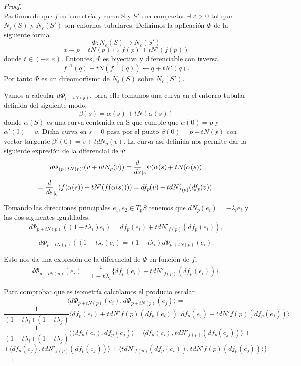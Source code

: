 \begin{proof}
	${ }$\\
	
	Partimos de que $f$ es isometría y como S y $S'$ son compactas $\exists$ $\varepsilon > 0$ tal que $N_\varepsilon(S)$ y $N_\varepsilon(S')$ son entornos tubulares. Definimos la aplicación $\Phi$ de la siguiente forma:
	\[
	\Phi : N_\varepsilon(S) \longrightarrow N_\varepsilon(S')
	\]
	\[
	x = p + tN(p) \longmapsto f(p) + tN'(f(p))
	\]
	donde $t \in (-\varepsilon, \varepsilon)$. Entonces, $\Phi$ es biyectiva y diferenciable con inversa
	\[
	f^{-1}(q) + tN(f^{-1}(q)) \longleftarrow q + tN'(q).
	\]
	Por tanto $\Phi$ es un difeomorfismo de $N_\varepsilon(S)$ sobre $N_\varepsilon(S')$.
	
	${ }$\\	
	
	Vamos a calcular $d\Phi_{p+tN(p)}$, para ello tomamos una curva en el entorno tubular definida del siguiente modo,
	\[
	\beta(s) = \alpha(s) + tN(\alpha(s))
	\]
	donde $\alpha(S)$ es una curva contenida en S que cumple que $\alpha(0) = p$ y $\alpha'(0) = v$. Dicha curva en $s = 0$ pasa por el punto $\beta(0) = p + tN(p)$  con vector tangente $\beta'(0) = v + tdN_p(v)$. La curva así definida nos permite dar la siguiente expresión de la diferencial de $\Phi$:
	\[
	d\Phi_{(p + tN(p))}(v + tdN_p(v)) = \frac{d}{ds}_{\arrowvert_0} \Phi(\alpha(s) + tN(\alpha(s))
	\]
	\[
	= \frac{d}{ds}_{\arrowvert_0} (f(\alpha(s)) + tN'(f(\alpha(s)))) = df_p(v) + tdN'_{f(p)}(df_p(v)).
	\]
	
	
	${ }$\\	
	
	Tomando las direcciones principales ${e_1, e_2} \in T_p S$ tenemos que $dN_p(e_i) = -\lambda_ie_i$ y las dos siguientes igualdades:
	\[
	d\Phi_{p + tN(p)}((1 - t\lambda_i)e_i) = df_p(e_i) + tdN'_{f(p)}(df_p(e_i)),
	\]
	
	\[
	d\Phi_{p + tN(p)}((1 - t\lambda_i)e_i) = (1 - t\lambda_i)d\Phi_{p + tN(p)}(e_i).
	\]
	
	Esto nos da una expresión de la diferencial de $\Phi$ en función de $f$,
	\[
	d\Phi_{p + tN(p)}(e_i) = \frac{1}{1 - t\lambda_i} \{df_p(e_i) + tdN'_{f(p)}(df_p(e_i))\}.
	\]
	
	Para comprobar que es isometría calculamos el producto escalar
	\[
	\langle d\Phi_{p + tN(p)}(e_i), d\Phi_{p + tN(p)}(e_j) \rangle = 
	\]
	\[
	\frac{1}{(1 - t\lambda_i)(1 - t\lambda_j)} \langle df_p(e_i) + tdN'{f(p)}(df_p(e_i)), df_p(e_j) + tdN'{f(p)}(df_p(e_j)) \rangle =
	\]
	\[
	\frac{1}{(1 - t\lambda_i)(1 - t\lambda_j)}( \langle df_p(e_i), df_p(e_j) \rangle +  \langle df_p(e_i), tdN'_{f(p)}(df_p(e_j)) \rangle + 
	\]
	\[
	+ \langle df_p(e_j), tdN'_{f(p)}(df_p(e_j)) \rangle + \langle tdN'_{f(p)}(df_p(e_i)), tdN'{f(p)}(df_p(e_j)) \rangle \}.
	\]
	

\end{proof}
